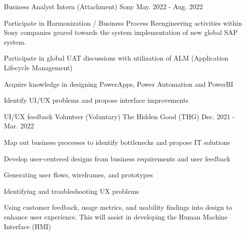 

\begin{cventries}

  \cventry
    {Business Analyst Intern (Attachment)} %
    {Sony} %
    {May. 2022 - Aug. 2022} %
    {} %
    {
      \begin{cvitems} %
        \item {Participate in Harmonization / Business Process Reengineering activities within Sony companies geared towards the system implementation of new global SAP system.}
        \item {Participate in global UAT discussions with utilization of ALM (Application Lifecycle Management)}
        \item {Acquire knowledge in designing PowerApps, Power Automation and PowerBI}
        \item {Identify UI/UX problems and propose interface improvements}
      \end{cvitems}
    }

  \cventry
    {UI/UX feedback Volunteer (Voluntary)} %
    {The Hidden Good (THG)} %
    {Dec. 2021 - Mar. 2022} %
    {} %
    {
      \begin{cvitems} %
        \item {Map out business processes to identify bottlenecks and propose IT solutions}
        \item {Develop user-centered designs from business requirements and user feedback}
        \item {Generating user flows, wireframes, and prototypes}
        \item {Identifying and troubleshooting UX problems}
        \item{Using customer feedback, usage metrics, and usability findings into design to enhance user experience. This will assist in developing the Human Machine Interface (HMI)}
      \end{cvitems}
    }
    

\end{cventries}

